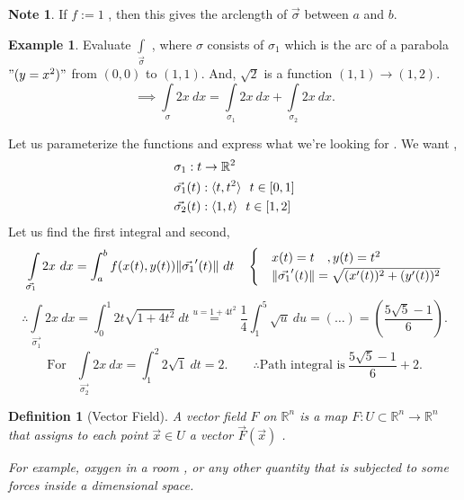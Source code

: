 \documentclass[
	12pt,
	]{article}
\newcommand{\la}{\langle}
\newcommand{\ra}{\rangle}
\newcommand{\R}{\mathbb{R}}
\DeclarePairedDelimiter{\norm}{\lVert}{\rVert}
\theoremstyle{custom}
\theoremstyle{custom}
\theoremstyle{custom}
\theoremstyle{custom}
\newtheorem{definition}{Definition}[section]
\theoremstyle{custom}
\theoremstyle{definition}
\newtheorem{example}{Example}[section]
\theoremstyle{example}
\newtheorem*{note}{Note}
\theoremstyle{note}
\theoremstyle{remark}
\theoremstyle{example}
\newcounter{theo}[section]\setcounter{theo}{0}
\numberwithin{equation}{subsection}
\begin{document}
  			\begin{note}
  				If $f:= 1$ , then this gives the arclength of $\vec{\sigma}$ between $a$ and $b$.
  			\end{note}
  			
  			\begin{example}
  				Evaluate $\int\limits_{\vec{\sigma}}$ , where $\sigma$ consists of $\sigma_{1}$ which is the arc of a parabola $"(y = x^{2})"$ from $(0,0)$ to $(1,1)$. And, $\sqrt{2}$ is a function $(1,1) \to (1,2)$.
  				$$ \implies \int\limits_{\sigma} 2x \ dx =\int\limits_{\sigma_{1}} 2x \ dx+ \int\limits_{\sigma_{2}} 2x \ dx .$$
  				
  				Let us parameterize the functions and express what we're looking for . We want ,
  				\begin{align*}
  					\raggedright
  					& \sigma_{1} : t \to \R^{2} \\
  					& \vec{\sigma_{1}}(t) : \la t, t^{2} \ra \ \ t\in [0,1] \\
  					& \vec{\sigma_{2}}(t) : \la 1 , t\ra \ \  t\in [1,2]
  				\end{align*}
  				Let us find the first integral and second,
  				\begin{equation*}
  					\int\limits_{\vec{\sigma_{1}}} 2x \ dx = \int_{a}^{b} f(x(t), y(t)) \norm{\vec{\sigma_{1}}'(t)} \ dt \quad 
  					\begin{cases}
  						& x(t) =t \quad , y(t) = t^{2} \\
  						& \norm{\vec{\sigma_{1}}'(t)} = \sqrt{(x'(t))^{2} +(y'(t))^{2}}
  					\end{cases}
  				\end{equation*}
  				\begin{equation*}
  					\therefore \int\limits_{\vec{\sigma_{1}}} 2x \ dx = \int_{0}^{1} 2t \sqrt{1 + 4t^{2}} \ dt \stackrel{u = 1+4t^{2}}{=} \frac14 \int_{1}^{5} \sqrt{u} \ du = (\dots) = \left(\frac{5\sqrt{5} -1}{6}\right).
  				\end{equation*}
  				\begin{equation*}
	  				\text{For } \ \ \int\limits_{\vec{\sigma_{2}}} 2x \ dx = \int_{1}^{2} 2 \sqrt{1} \ dt = 2.\qquad \therefore \text{Path integral is} \ \boxed{\frac{5\sqrt{5}-1}{6} +2}.
  				\end{equation*}
  			\end{example}
  			
  			\begin{definition}[Vector Field]
  				A vector field $F$ on $\R^{n}$ is a map $F:U \subset \R^{n} \to \R^{n}$ that assigns to each point $\vec{x} \in U$ a vector $\vec{F}(\vec{x})$ . 
  				
  				For example, oxygen in a room , or any other quantity that is subjected to some forces inside a dimensional space.
  			\end{definition}
  			
\end{document}
